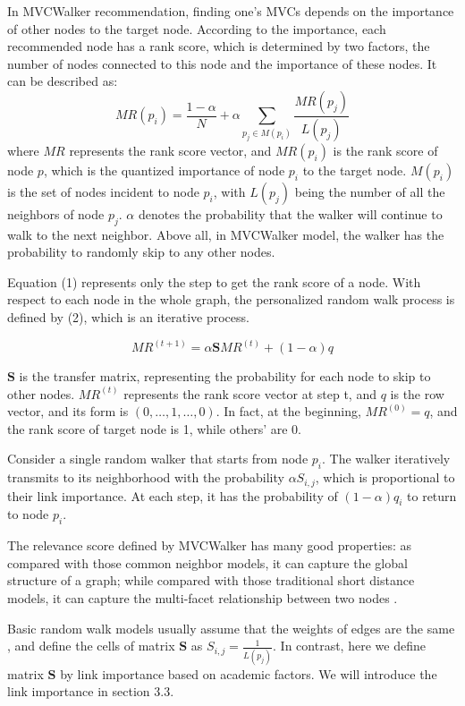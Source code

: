 \documentclass[10pt,journal,compsoc]{IEEEtran}
\begin{document}
In MVCWalker recommendation, finding one's MVCs depends on the importance of other nodes to the target node. According to the importance, each recommended node has a rank score, which is determined by two factors, the number of nodes connected to this node and the importance of these nodes. It can be described as:
\begin{equation}
MR(p_{i})=\frac{1-\alpha}{N}+\alpha \sum_{p_{j}\in M(p_{i})}\frac{MR(p_{j})}{L(p_{j})}
\end{equation}
where $MR$ represents the rank score vector, and $MR(p_{i})$ is the rank score of node $p$, which is the quantized importance of node $p_{i}$ to the target node. $M(p_{i})$ is the set of nodes incident to node $p_{i}$, with $L(p_{j})$ being the number of all the neighbors of node $p_{j}$. $\alpha$ denotes the probability that the walker will continue to walk to the next neighbor. Above all, in MVCWalker model, the walker has the probability to randomly skip to any other nodes.

Equation (1) represents only the step to get the rank score of a node. With respect to each node in the whole graph, the personalized random walk process is defined by (2), which is an iterative process.

\begin{equation}
MR^{(t+1)}=\alpha \mathbf{S}MR^{(t)}+(1-\alpha)q
\end{equation}

$\mathbf{S}$ is the transfer matrix, representing the probability for each node to skip to other nodes. $MR^{(t)}$ represents the rank score vector at step t, and $q$ is the row vector, and its form is $(0, \ldots, 1, \ldots, 0)$. In fact, at the beginning, $MR^{(0)}=q$, and the rank score of target node is 1, while others' are 0.

Consider a single random walker that starts from node $p_{i}$. The walker iteratively transmits to its neighborhood with the probability $\alpha S_{i,j}$, which is proportional to their link importance. At each step, it has the probability of $(1-\alpha)q_{i}$ to return to node $p_{i}$.

The relevance score defined by MVCWalker has many good properties: as compared with those common neighbor models, it can capture the global structure of a graph; while compared with those traditional short distance models, it can capture the multi-facet relationship between two nodes \cite{Tong:center}.

Basic random walk models usually assume that the weights of edges are the same \cite{tong2006fast}, and define the cells of matrix $\mathbf{S}$ as $S_{i,j}=\frac{1}{L(p_{j})}$. In contrast, here we define matrix $\mathbf{S}$ by link importance based on academic factors. We will introduce the link importance in section 3.3.
\end{document}

